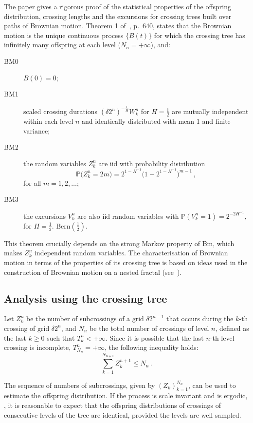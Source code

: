 \documentclass[a4paper]{article}
\newcommand{\pr}{\mathbb{P}}
\begin{document}
The paper \cite{ECP1673} gives a rigorous proof of the statistical properties of
the offspring distribution, crossing lengths and the excursions for crossing trees
built over paths of Brownian motion. Theorem 1 of~\cite{ECP1673}, p.~640, states
that the Brownian motion is the unique continuous process $\{B(t)\}$ for which the
crossing tree has infinitely many offspring at each level ($N_n = +\infty$), and:
\begin{description}
    \item[BM0] $B(0) = 0$;
    \item[BM1] scaled crossing durations $(\delta 2^n)^{-\frac{1}{H}} W_k^n$ for
    $H = \frac{1}{2}$ are mutually independent within each level $n$ and identically
    distributed with mean 1 and finite variance;
    \item[BM2] the random variables $Z_k^n$ are iid with probability distribution
    \[ \pr\bigl(Z_k^n=2m\bigr) = 2^{1-H^{-1}}\bigl(1-2^{1-H^{-1}}\bigr)^{m-1} \,,\]
    for all $m=1,2,\ldots$;
    \item[BM3] the excursions $V_k^n$ are also iid random variables with 
    $\pr( V_k^n = 1 ) = 2^{-2H^{-1}}$, for $H = \frac{1}{2}$.
    $\text{Bern}(\frac{1}{2})$.
\end{description}
This theorem crucially depends on the strong Markov property of Bm, which makes $Z_k^n$
independent random variables. The characterisation of Brownian motion in terms of
the properties of its crossing tree is based on ideas used in the construction of
Brownian motion on a nested fractal (see~\cite{BarlowPerkins88}).


\subsection{Analysis using the crossing tree} %
\label{sub:analysis_using_the_crossing_tree}

Let $Z_k^n$ be the number of subcrossings of a grid $\delta 2^{n-1}$ that occurs
during the $k$-th crossing of grid $\delta 2^n$, and $N_n$ be the total number
of crossings of level $n$, defined as the last $k\geq0$ such that
$T_k^n < +\infty$. Since it is possible that the last $n$-th level crossing is
incomplete, $T_{N_n}^n = +\infty$, the following inequality holds:
\[ \sum_{k=1}^{N_{n+1}} Z_k^{n+1} \leq N_n \,.\]

The sequence of numbers of subcrossings, given by $(Z_k)_{k=1}^{N_n}$, can be used to
estimate the offspring distribution.
If the process is scale invariant and is ergodic, \cite{ECP1673}, it is reasonable to
expect that the offspring distributions of crossings of consecutive
levels of the tree are identical, provided the levels are well sampled.
\end{document}
